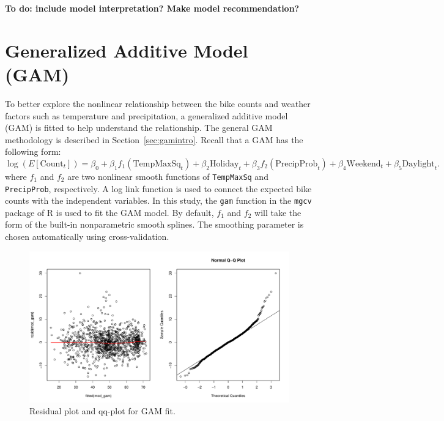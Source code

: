 \documentclass [11pt, proquest] {uwthesis}[2015/03/03]
\begin{document}
\textbf{To do: include model interpretation? Make model recommendation?}


\section{Generalized Additive Model (GAM)}

To better explore the nonlinear relationship between the bike counts and weather factors such as temperature and precipitation, a generalized additive model (GAM) is fitted to help understand the relationship. The general GAM methodology is described in Section~\ref{sec:gamintro}. Recall that a GAM has the following form:
\begin{equation}
\log(E[\text{Count}_t]) = \beta_0 + \beta_1 f_1(\text{TempMaxSq}_t) + \beta_2 \text{Holiday}_t + \beta_3 f_2(\text{PrecipProb}_t) + \beta_4 \text{Weekend}_t + \beta_5 \text{Daylight}_t. \label{eqref:gamodel}
\end{equation}
where $f_1$ and $f_2$ are two nonlinear smooth functions of \texttt{TempMaxSq} and \texttt{PrecipProb}, respectively. A log link function is used to connect the expected bike counts with the independent variables. In this study, the \texttt{gam} function in the \texttt{mgcv} package of R is used to fit the GAM model. By default, $f_1$ and $f_2$ will take the form of the built-in nonparametric smooth splines. The smoothing parameter is chosen automatically using cross-validation.

\begin{figure}
\centering
\vspace{-1cm}
   \includegraphics[width=1\textwidth]{figures/gam_resid} 
  \caption{Residual plot and qq-plot for GAM fit.}
  \label{fig:smooth_resid}
\vspace{-1cm}
\end{figure}
\end{document}
